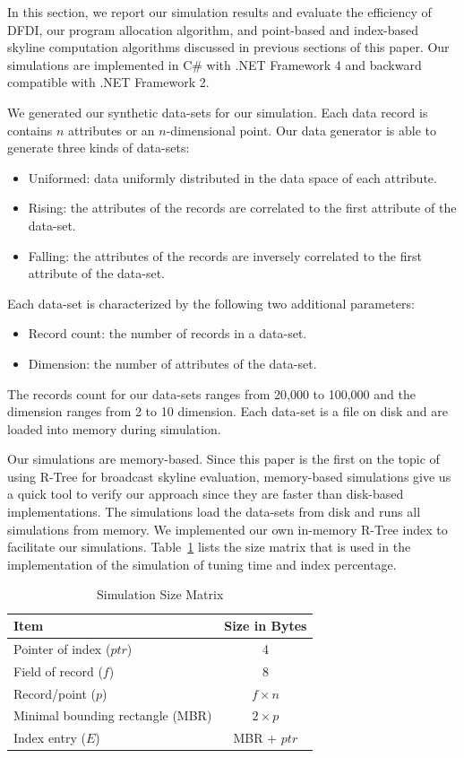 In this section, we report our simulation results and evaluate the
efficiency of DFDI, our program allocation algorithm, and point-based
and index-based skyline computation algorithms discussed in previous
sections of this paper. Our simulations are implemented in C\# with
.NET Framework 4 and backward compatible with .NET Framework 2.

We generated our synthetic data-sets for our simulation. Each data record
is contains $n$ attributes or an $n$-dimensional point. Our data generator
is able to generate three kinds of data-sets:
\begin{itemize}
\item Uniformed: data uniformly distributed in the data space of each
    attribute.
\item Rising: the attributes of the records are correlated to the first
    attribute of the data-set.
\item Falling: the attributes of the records are inversely correlated to
    the first attribute of the data-set.
\end{itemize}

Each data-set is characterized by the following two additional parameters:
\begin{itemize}
\item Record count: the number of records in a data-set.
\item Dimension: the number of attributes of the data-set.
\end{itemize}

The records count for our data-sets ranges from 20,000 to 100,000 and the
dimension ranges from 2 to 10 dimension. Each data-set is a file on disk
and are loaded into memory during simulation.

Our simulations are memory-based. Since this paper is the first on the topic
of using R-Tree for broadcast skyline evaluation, memory-based simulations
give us a quick tool to verify our approach since they are faster than
disk-based implementations.  The simulations load the
data-sets from disk and runs all simulations from memory.
We implemented our own in-memory R-Tree index to facilitate our simulations.
Table~\ref{tab:sim_size} lists the size matrix that is used in the
implementation of the simulation of tuning time and index percentage.

\begin{table}[h]
\caption{Simulation Size Matrix} \label{tab:sim_size}
\centering
\begin{tabular}{l|c}
\hline
{\bf Item} & {\bf Size in Bytes}\\
\hline
Pointer of index ($ptr$) & 4\\
Field of record ($f$) & 8\\
Record/point ($p$) & $f \times n$\\
Minimal bounding rectangle (MBR) & $2 \times p$\\
Index entry ($E$) & MBR + $ptr$\\
\hline
\end{tabular}
\end{table}

